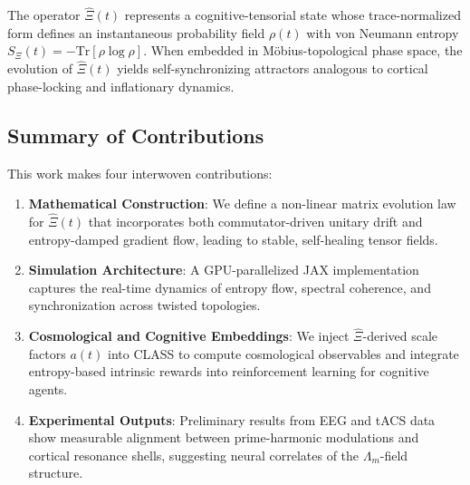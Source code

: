 \documentclass[12pt]{article}
\theoremstyle{plain}
\begin{document}
The operator $\hat{\Xi}(t)$ represents a cognitive-tensorial state whose trace-normalized form defines an instantaneous probability field $\rho(t)$ with von Neumann entropy $S_\Xi(t) = -\text{Tr}[\rho \log \rho]$. When embedded in Möbius-topological phase space, the evolution of $\hat{\Xi}(t)$ yields self-synchronizing attractors analogous to cortical phase-locking and inflationary dynamics.

\subsection{Summary of Contributions}

This work makes four interwoven contributions:

\begin{enumerate}
    \item \textbf{Mathematical Construction}: We define a non-linear matrix evolution law for $\hat{\Xi}(t)$ that incorporates both commutator-driven unitary drift and entropy-damped gradient flow, leading to stable, self-healing tensor fields.
    
    \item \textbf{Simulation Architecture}: A GPU-parallelized JAX implementation captures the real-time dynamics of entropy flow, spectral coherence, and synchronization across twisted topologies.
    
    \item \textbf{Cosmological and Cognitive Embeddings}: We inject $\hat{\Xi}$-derived scale factors $a(t)$ into CLASS to compute cosmological observables and integrate entropy-based intrinsic rewards into reinforcement learning for cognitive agents.
    
    \item \textbf{Experimental Outputs}: Preliminary results from EEG and tACS data show measurable alignment between prime-harmonic modulations and cortical resonance shells, suggesting neural correlates of the $\Lambda_m$-field structure.
\end{enumerate}

\nocite{*}


\end{document}
